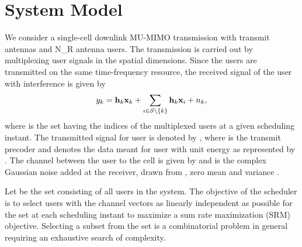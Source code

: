 \documentclass[conference]{./../../IEEE/IEEEtran}
\begin{document}
\section{System Model}
\label{sec:system_model}
We consider a single-cell downlink \ac{MU-MIMO} transmission with  transmit antennas and  \ac{N_R} antenna users. The transmission is carried out by multiplexing user signals in the spatial dimensions. Since the users are transmitted on the same time-frequency resource, the received signal  of the user  with interference is given by
\begin{equation}
y_k = \mathbf{h}_{k} \mathbf{x}_{k} + \sum_{i \in \mathcal{S} \backslash \{k\}} \mathbf{h}_{k} \mathbf{x}_{i} + n_k,
\end{equation}
where  is the set having the indices of the multiplexed users at a given scheduling instant. The transmitted signal for user  is denoted by , where  is the transmit precoder and  denotes the data meant for user  with unit energy as represented by . The channel between the user  to the cell is given by  and  is the complex Gaussian noise added at the receiver, drawn from , zero mean and variance .

Let  be the set consisting of all users in the system. The objective of the scheduler is to select users with the channel vectors as linearly independent as possible for the set  at each scheduling instant to maximize a sum rate maximization (SRM) objective. Selecting a subset  from the set  is a combinatorial problem in general requiring an exhaustive search of  complexity.
\end{document}
